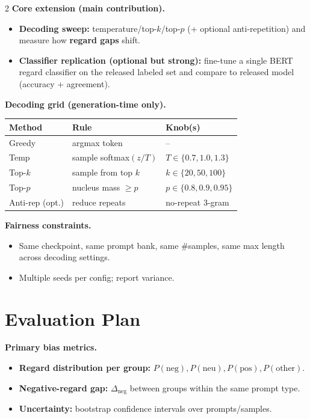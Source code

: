 \documentclass[10pt]{article}
\begin{document}
\begin{multicols}{2}
\textbf{Core extension (main contribution).}
\begin{itemize}
  \item \textbf{Decoding sweep:} temperature/top-$k$/top-$p$ (+ optional anti-repetition) and measure how \textbf{regard gaps} shift.
  \item \textbf{Classifier replication (optional but strong):} fine-tune a single BERT regard classifier on the released labeled set and compare to released model (accuracy + agreement).
\end{itemize}

\textbf{Decoding grid (generation-time only).}
\vspace{-1mm}
\begin{center}
\footnotesize
\begin{tabularx}{\columnwidth}{@{}lXl@{}}
\toprule
\textbf{Method} & \textbf{Rule} & \textbf{Knob(s)} \\
\midrule
Greedy & argmax token & -- \\
Temp & sample softmax$(z/T)$ & $T\in\{0.7,1.0,1.3\}$ \\
Top-$k$ & sample from top $k$ & $k\in\{20,50,100\}$ \\
Top-$p$ & nucleus mass $\ge p$ & $p\in\{0.8,0.9,0.95\}$ \\
Anti-rep (opt.) & reduce repeats & no-repeat 3-gram \\
\bottomrule
\end{tabularx}
\end{center}
\vspace{-1mm}

\textbf{Fairness constraints.}
\begin{itemize}
  \item Same checkpoint, same prompt bank, same \#samples, same max length across decoding settings.
  \item Multiple seeds per config; report variance.
\end{itemize}

\section*{Evaluation Plan}
\textbf{Primary bias metrics.}
\begin{itemize}
  \item \textbf{Regard distribution per group:} $P(\text{neg}),P(\text{neu}),P(\text{pos}),P(\text{other})$.
  \item \textbf{Negative-regard gap:} $\Delta_{\text{neg}}$ between groups within the same prompt type.
  \item \textbf{Uncertainty:} bootstrap confidence intervals over prompts/samples.
\end{itemize}


\end{multicols}
\end{document}

